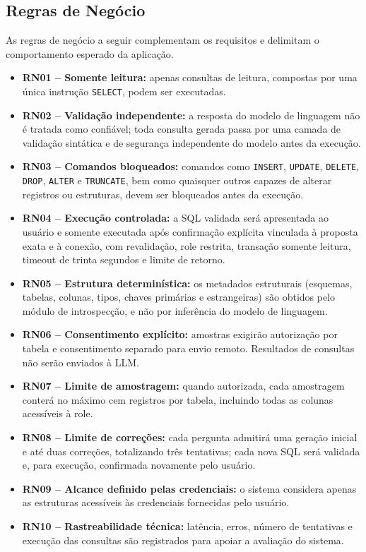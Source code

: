 \begin{apendicesenv}
\section{Regras de Negócio}
\label{ap:regras}

As regras de negócio a seguir complementam os requisitos e delimitam o comportamento esperado da aplicação.

\begin{itemize}
    \item \textbf{RN01 -- Somente leitura:} apenas consultas de leitura, compostas por uma única instrução \texttt{SELECT}, podem ser executadas.
    \item \textbf{RN02 -- Validação independente:} a resposta do modelo de linguagem não é tratada como confiável; toda consulta gerada passa por uma camada de validação sintática e de segurança independente do modelo antes da execução.
    \item \textbf{RN03 -- Comandos bloqueados:} comandos como \texttt{INSERT}, \texttt{UPDATE}, \texttt{DELETE}, \texttt{DROP}, \texttt{ALTER} e \texttt{TRUNCATE}, bem como quaisquer outros capazes de alterar registros ou estruturas, devem ser bloqueados antes da execução.
    \item \textbf{RN04 -- Execução controlada:} a SQL validada será apresentada ao usuário e somente executada após confirmação explícita vinculada à proposta exata e à conexão, com revalidação, role restrita, transação somente leitura, timeout de trinta segundos e limite de retorno.
    \item \textbf{RN05 -- Estrutura determinística:} os metadados estruturais (esquemas, tabelas, colunas, tipos, chaves primárias e estrangeiras) são obtidos pelo módulo de introspecção, e não por inferência do modelo de linguagem.
    \item \textbf{RN06 -- Consentimento explícito:} amostras exigirão autorização por tabela e consentimento separado para envio remoto. Resultados de consultas não serão enviados à LLM.
    \item \textbf{RN07 -- Limite de amostragem:} quando autorizada, cada amostragem conterá no máximo cem registros por tabela, incluindo todas as colunas acessíveis à role.
    \item \textbf{RN08 -- Limite de correções:} cada pergunta admitirá uma geração inicial e até duas correções, totalizando três tentativas; cada nova SQL será validada e, para execução, confirmada novamente pelo usuário.
    \item \textbf{RN09 -- Alcance definido pelas credenciais:} o sistema considera apenas as estruturas acessíveis às credenciais fornecidas pelo usuário.
    \item \textbf{RN10 -- Rastreabilidade técnica:} latência, erros, número de tentativas e execução das consultas são registrados para apoiar a avaliação do sistema.


\end{itemize}
\end{apendicesenv}
